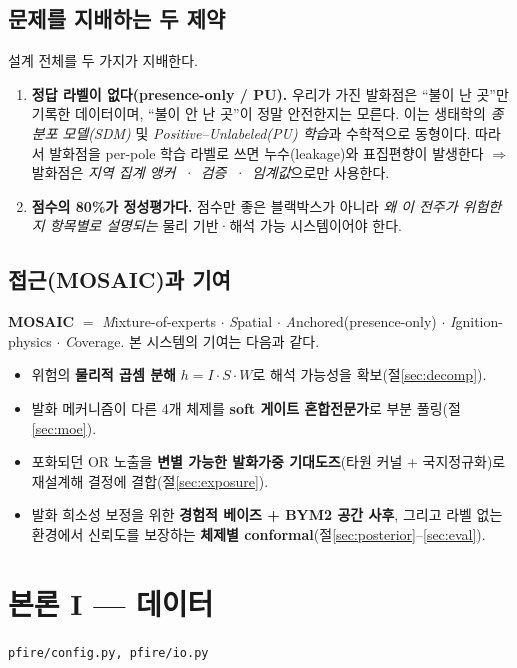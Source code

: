 \documentclass[11pt,a4paper]{article}
\newcommand{\src}[1]{{\footnotesize\color{gray}\texttt{#1}}}
\begin{document}
\subsection{문제를 지배하는 두 제약}
설계 전체를 두 가지가 지배한다.
\begin{enumerate}[leftmargin=1.4em]
\item \textbf{정답 라벨이 없다(presence-only / PU).} 우리가 가진 발화점은 ``불이 난 곳''만 기록한
데이터이며, ``불이 안 난 곳''이 정말 안전한지는 모른다. 이는 생태학의 \emph{종 분포 모델(SDM)}
및 \emph{Positive--Unlabeled(PU) 학습}과 수학적으로 동형이다. 따라서 발화점을 per-pole 학습
라벨로 쓰면 누수(leakage)와 표집편향이 발생한다 $\Rightarrow$ 발화점은 \emph{지역 집계 앵커
\,·\, 검증 \,·\, 임계값}으로만 사용한다.
\item \textbf{점수의 80\%가 정성평가다.} 점수만 좋은 블랙박스가 아니라 \emph{왜 이 전주가 위험한지
항목별로 설명되는} 물리 기반·해석 가능 시스템이어야 한다.
\end{enumerate}

\subsection{접근(MOSAIC)과 기여}
\textbf{MOSAIC} $=$ \emph{M}ixture-of-experts $\cdot$ \emph{S}patial $\cdot$
\emph{A}nchored(presence-only) $\cdot$ \emph{I}gnition-physics $\cdot$ \emph{C}overage.
본 시스템의 기여는 다음과 같다.
\begin{itemize}[leftmargin=1.4em,itemsep=1pt]
\item 위험의 \textbf{물리적 곱셈 분해} $h=I\cdot S\cdot W$로 해석 가능성을 확보(절\ref{sec:decomp}).
\item 발화 메커니즘이 다른 4개 체제를 \textbf{soft 게이트 혼합전문가}로 부분 풀링(절\ref{sec:moe}).
\item 포화되던 OR 노출을 \textbf{변별 가능한 발화가중 기대도즈}(타원 커널 + 국지정규화)로
재설계해 결정에 결합(절\ref{sec:exposure}).
\item 발화 희소성 보정을 위한 \textbf{경험적 베이즈 + BYM2 공간 사후}, 그리고 라벨 없는 환경에서
신뢰도를 보장하는 \textbf{체제별 conformal}(절\ref{sec:posterior}--\ref{sec:eval}).
\end{itemize}

\section{본론 I — 데이터}
\src{pfire/config.py, pfire/io.py}
\end{document}
